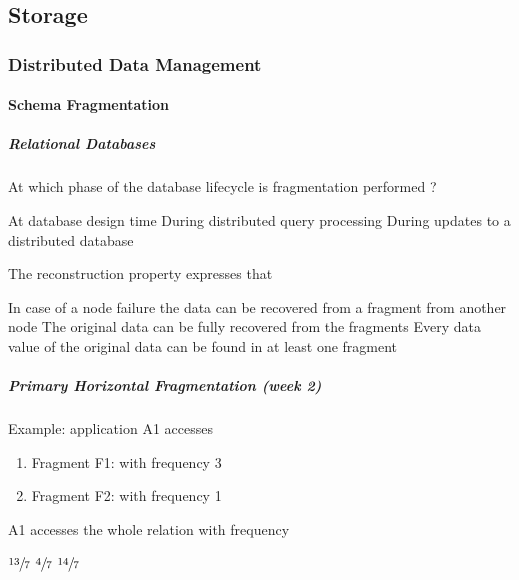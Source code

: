 \documentclass[12pt,a4paper,answers]{exam} %
\begin{document}
\begin{flushleft}
\begin{multicols*}{2}
\begin{questions}
\part{Storage}
\section{Distributed Data Management}

\subsection{Schema Fragmentation}
\subsubsection{Relational Databases}

\question At which phase of the database lifecycle is fragmentation performed ?
\begin{checkboxes}
\CorrectChoice At database design time
\choice During distributed query processing
\choice During updates to a distributed database
\end{checkboxes}

\question The reconstruction property expresses that
\begin{checkboxes}
\choice In case of a node failure the data can be recovered from a fragment from another node
\CorrectChoice The original data can be fully recovered from the fragments
\choice Every data value of the original data can be found in at least one fragment
\end{checkboxes}


\subsubsection{Primary Horizontal Fragmentation (week 2)} %

\question Example: application A1 accesses
\begin{enumerate}
\item Fragment F1: with frequency 3
\item Fragment F2: with frequency 1
\end{enumerate}
A1 accesses the whole relation with frequency
\begin{checkboxes}
\CorrectChoice $\sfrac{13}{7}$
\choice $\sfrac{4}{7}$
\choice $\sfrac{14}{7}$
\end{checkboxes}


\end{questions}
\end{multicols*}
\end{flushleft}
\end{document}
